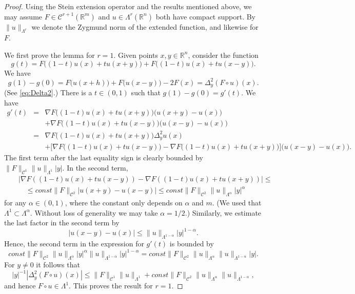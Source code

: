 \documentclass[11pt]{amsart}
\numberwithin{equation}{section}
\theoremstyle{definition}
\newcommand\Cscr{\mathscr{C}}
\newcommand\R{\mathbb{R}}
\begin{document}
\begin{proof}
Using the Stein extension operator 
\cite[Sect.\ VI.2]{SteinEM1970} and the results 
mentioned above, we may assume $F\in \Cscr^{r+1}(\R^m)$
and $u\in \Lambda^r(\R^n)$ both have compact support.
By $\|u\|_{\Lambda^r}$ we denote the Zygmund norm 
of the extended function, and likewise for $F$.

We first prove the lemma for $r=1$. Given points $x,y\in\R^n$,
consider the function 
\[
 	g(t)=F\big((1-t)u(x)+tu(x+y)\big) +F\big((1-t)u(x)+tu(x-y)\big).
\]
We have 
\[
	g(1)-g(0) = F\big(u(x+h)\big)+ F\big(u(x-y)\big)-2F(x) 
	= \Delta^2_y (F\circ u)(x).
\]
(See \eqref{eq:Delta2}.) There is a $t\in (0,1)$ such that $g(1)-g(0) =g'(t)$. We have
\begin{eqnarray*}
   g'(t) &=& \nabla F\big((1-t)u(x)+tu(x+y)\big) \big(u(x+y)-u(x)\big)\\
   && +\nabla F\big((1-t)u(x)+tu(x-y)\big) \big(u(x-y)-u(x)\big) \\
   &=& \nabla F\big((1-t)u(x)+tu(x+y)\big)\Delta^2_y u(x) \\
   && + \big[\nabla F\big((1-t)u(x)+tu(x-y)\big) 
   	- \nabla F\big((1-t)u(x)+tu(x+y)\big)\big] 
   				\big(u(x-y)-u(x)\big). 
\end{eqnarray*}
The first term after the last equality sign is clearly bounded by 
$\|F\|_{\Cscr^1}\|u\|_{\Lambda^1}|y|$. In the second term,
\begin{eqnarray*}
	&& \big|\nabla F((1-t)u(x)+tu(x-y)) - \nabla F((1-t)u(x)+tu(x+y))\big| \le \\
	&& \quad \le const \|F\|_{\Cscr^2} |u(x+y)-u(x-y)| 
	\le const \|F\|_{\Cscr^2} \|u\|_{\Lambda^\alpha}|y|^\alpha
\end{eqnarray*}
for any $\alpha \in (0,1)$, where the constant only depends on 
$\alpha$ and $m$. (We used that $\Lambda^1\subset \Lambda^\alpha$.
Without loss of generality we may take $\alpha=1/2$.)
Similarly, we estimate the last factor in the second term by 
\[
	|u(x-y)-u(x)| \le \|u\|_{\Lambda^{1-\alpha}} |y|^{1-\alpha}.
\]
Hence, the second term in the expression for $g'(t)$ is bounded by 
\[
	const \|F\|_{\Cscr^2} \|u\|_{\Lambda^\alpha}|y|^\alpha
	 \|u\|_{\Lambda^{1-\alpha}}|y|^{1-\alpha}
	 = const \|F\|_{\Cscr^2} \|u\|_{\Lambda^\alpha}
	 \|u\|_{\Lambda^{1-\alpha}} |y|.
\]
For $y \ne 0$ it follows that 
\[ 
	|y|^{-1} |\Delta^2_y (F\circ u)(x)| \le  
	\|F\|_{\Cscr^1}\|u\|_{\Lambda^1} +
	const \|F\|_{\Cscr^2} \|u\|_{\Lambda^\alpha}
	\|u\|_{\Lambda^{1-\alpha}},
\]
and hence $F\circ u\in \Lambda^1$. This proves the result for $r=1$. 

\end{proof}
\end{document}
